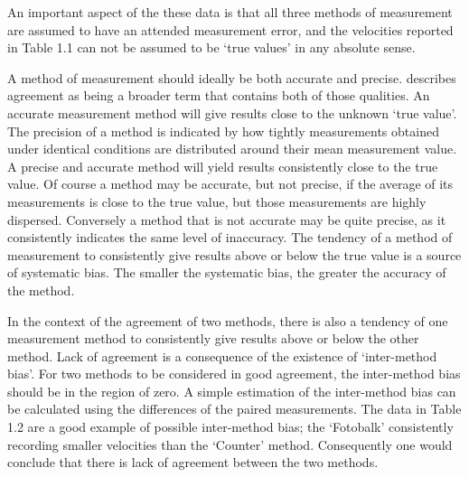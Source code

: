 \documentclass[12pt, a4paper]{report}
\theoremstyle{plain}
\theoremstyle{definition}
\theoremstyle{remark}
\begin{document}
An important aspect of the these data is that all three methods of
measurement are assumed to have an attended measurement error, and
the velocities reported in Table 1.1 can not be assumed to be
`true values' in any absolute sense.


A method of measurement should ideally be both accurate and
precise. \citet{Barnhart} describes agreement as being a broader
term that contains both of those qualities. An accurate
measurement method will give results close to the unknown `true
value'. The precision of a method is indicated by how tightly
measurements obtained under identical conditions are distributed
around their mean measurement value. A precise and accurate method
will yield results consistently close to the true value. Of course
a method may be accurate, but not precise, if the average of its
measurements is close to the true value, but those measurements
are highly dispersed. Conversely a method that is not accurate may
be quite precise, as it consistently indicates the same level of
inaccuracy. The tendency of a method of measurement to
consistently give results above or below the true value is a
source of systematic bias. The smaller the systematic bias, the
greater the accuracy of the method.


In the context of the agreement of two methods, there is also a
tendency of one measurement method to consistently give results
above or below the other method. Lack of agreement is a
consequence of the existence of `inter-method bias'. For two
methods to be considered in good agreement, the inter-method bias
should be in the region of zero. A simple estimation of the
inter-method bias can be calculated using the differences of the
paired measurements. The data in Table 1.2 are a good example of
possible inter-method bias; the `Fotobalk' consistently recording
smaller velocities than the `Counter' method. Consequently one
would conclude that there is lack of agreement between the two
methods.
\end{document}
